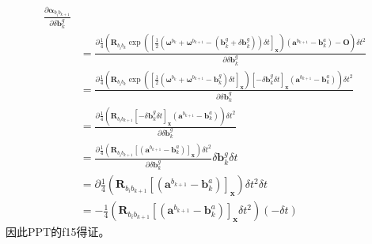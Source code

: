\documentclass[oneside]{article}
\begin{document}
\begin{align}
    \frac{\partial \boldsymbol{\alpha}_{b_{i} b_{k+1}}}{\partial \delta \mathbf{b}_{k}^{g}}    \\
 &= \frac{\partial\frac{1}{4}\left(\mathbf{R}_{b_{i} b_{k}}
\exp \left( \left[ \frac{1}{2}(\mathbf{\omega}^{b_k} + \mathbf{\omega}^{b_{k + 1}} - (\mathbf{b}_k^g + \delta \mathbf{b}_k^g))\delta t \right]_{\mathbf{x}}\right)
 \left({\mathbf{a}}^{b_{k+1}}-\mathbf{b}_{k}^{a}\right)-\mathbf{O} \right)   \delta t^2}{\partial \delta \mathbf{b}_{k}^{g}} \\
 &= \frac{\partial\frac{1}{4}\left(\mathbf{R}_{b_{i} b_{k}}
 \exp \left( \left[ \frac{1}{2}(\mathbf{\omega}^{b_k} + \mathbf{\omega}^{b_{k + 1}} - \mathbf{b}_k^g ) \delta t\right]_{\mathbf{x}}\right)
 \left[-\delta \mathbf{b}_k^g \delta t \right]_\mathbf{x}
  \left({\mathbf{a}}^{b_{k+1}}-\mathbf{b}_{k}^{a}\right) \right)   \delta t^2}{\partial \delta \mathbf{b}_{k}^{g}} \\
&= \frac{\partial\frac{1}{4}\left(\mathbf{R}_{b_{i} b_{k+1}}
  \left[-\delta \mathbf{b}_k^g \delta t \right]_\mathbf{x}
   \left({\mathbf{a}}^{b_{k+1}}-\mathbf{b}_{k}^{a}\right) \right)   \delta t^2}{\partial \delta \mathbf{b}_{k}^{g}}  \\
&= \frac{\partial\frac{1}{4}\left(\mathbf{R}_{b_{i} b_{k+1}}
   \left[ \left({\mathbf{a}}^{b_{k+1}}-\mathbf{b}_{k}^{a}\right) \right]_\mathbf{x}
     \right)   \delta t^2}{\partial \delta \mathbf{b}_{k}^{g}}    
    \delta \mathbf{b}_k^g \delta t \\
&= \partial\frac{1}{4}\left(\mathbf{R}_{b_{i} b_{k+1}}
    \left[ \left({\mathbf{a}}^{b_{k+1}}-\mathbf{b}_{k}^{a}\right) \right]_\mathbf{x}
      \right)   \delta t^2  \delta t  \\
&=-\frac{1}{4}\left(\mathbf{R}_{b_{i} b_{k+1}}\left[\left(\mathbf{a}^{b_{k+1}}-\mathbf{b}_{k}^{a}\right)\right]_{\mathbf{x}} \delta t^{2}\right)(-\delta t)
\end{align} 
因此PPT的f15得证。
\end{document}
